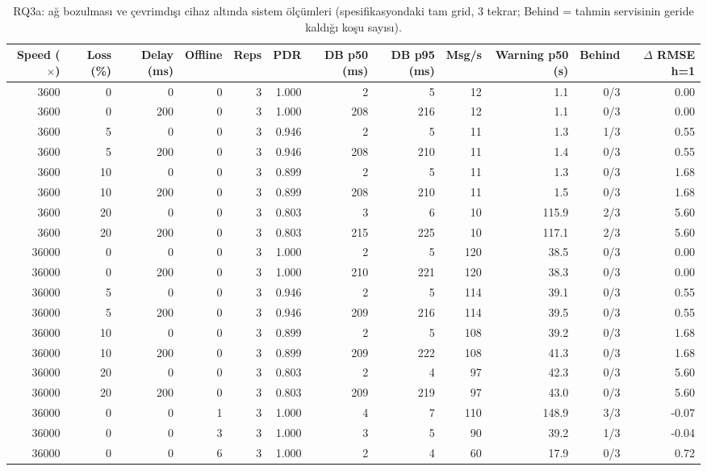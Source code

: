 \begin{table}[t]
\caption{RQ3a: ağ bozulması ve çevrimdışı cihaz altında sistem ölçümleri (spesifikasyondaki tam grid, 3 tekrar; Behind = tahmin servisinin geride kaldığı koşu sayısı).}
\label{tab:rq3a}
\centering\footnotesize
\begin{tabular}{rrrrrrrrrrrr}
\toprule
Speed ($\times$) & Loss (\%) & Delay (ms) & Offline & Reps & PDR & DB p50 (ms) & DB p95 (ms) & Msg/s & Warning p50 (s) & Behind & $\Delta$ RMSE h=1 \\
\midrule
3600 & 0 & 0 & 0 & 3 & 1.000 & 2 & 5 & 12 & 1.1 & 0/3 & 0.00 \\
3600 & 0 & 200 & 0 & 3 & 1.000 & 208 & 216 & 12 & 1.1 & 0/3 & 0.00 \\
3600 & 5 & 0 & 0 & 3 & 0.946 & 2 & 5 & 11 & 1.3 & 1/3 & 0.55 \\
3600 & 5 & 200 & 0 & 3 & 0.946 & 208 & 210 & 11 & 1.4 & 0/3 & 0.55 \\
3600 & 10 & 0 & 0 & 3 & 0.899 & 2 & 5 & 11 & 1.3 & 0/3 & 1.68 \\
3600 & 10 & 200 & 0 & 3 & 0.899 & 208 & 210 & 11 & 1.5 & 0/3 & 1.68 \\
3600 & 20 & 0 & 0 & 3 & 0.803 & 3 & 6 & 10 & 115.9 & 2/3 & 5.60 \\
3600 & 20 & 200 & 0 & 3 & 0.803 & 215 & 225 & 10 & 117.1 & 2/3 & 5.60 \\
36000 & 0 & 0 & 0 & 3 & 1.000 & 2 & 5 & 120 & 38.5 & 0/3 & 0.00 \\
36000 & 0 & 200 & 0 & 3 & 1.000 & 210 & 221 & 120 & 38.3 & 0/3 & 0.00 \\
36000 & 5 & 0 & 0 & 3 & 0.946 & 2 & 5 & 114 & 39.1 & 0/3 & 0.55 \\
36000 & 5 & 200 & 0 & 3 & 0.946 & 209 & 216 & 114 & 39.5 & 0/3 & 0.55 \\
36000 & 10 & 0 & 0 & 3 & 0.899 & 2 & 5 & 108 & 39.2 & 0/3 & 1.68 \\
36000 & 10 & 200 & 0 & 3 & 0.899 & 209 & 222 & 108 & 41.3 & 0/3 & 1.68 \\
36000 & 20 & 0 & 0 & 3 & 0.803 & 2 & 4 & 97 & 42.3 & 0/3 & 5.60 \\
36000 & 20 & 200 & 0 & 3 & 0.803 & 209 & 219 & 97 & 43.0 & 0/3 & 5.60 \\
36000 & 0 & 0 & 1 & 3 & 1.000 & 4 & 7 & 110 & 148.9 & 3/3 & -0.07 \\
36000 & 0 & 0 & 3 & 3 & 1.000 & 3 & 5 & 90 & 39.2 & 1/3 & -0.04 \\
36000 & 0 & 0 & 6 & 3 & 1.000 & 2 & 4 & 60 & 17.9 & 0/3 & 0.72 \\
\bottomrule
\end{tabular}
\end{table}
